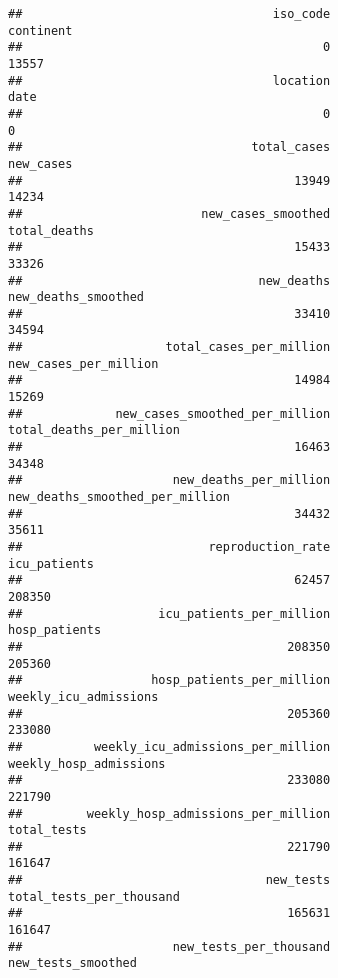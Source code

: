 \documentclass[
]{article}
\begin{document}
\begin{verbatim}
##                                   iso_code                                  continent 
##                                          0                                      13557 
##                                   location                                       date 
##                                          0                                          0 
##                                total_cases                                  new_cases 
##                                      13949                                      14234 
##                         new_cases_smoothed                               total_deaths 
##                                      15433                                      33326 
##                                 new_deaths                        new_deaths_smoothed 
##                                      33410                                      34594 
##                    total_cases_per_million                      new_cases_per_million 
##                                      14984                                      15269 
##             new_cases_smoothed_per_million                   total_deaths_per_million 
##                                      16463                                      34348 
##                     new_deaths_per_million            new_deaths_smoothed_per_million 
##                                      34432                                      35611 
##                          reproduction_rate                               icu_patients 
##                                      62457                                     208350 
##                   icu_patients_per_million                              hosp_patients 
##                                     208350                                     205360 
##                  hosp_patients_per_million                      weekly_icu_admissions 
##                                     205360                                     233080 
##          weekly_icu_admissions_per_million                     weekly_hosp_admissions 
##                                     233080                                     221790 
##         weekly_hosp_admissions_per_million                                total_tests 
##                                     221790                                     161647 
##                                  new_tests                   total_tests_per_thousand 
##                                     165631                                     161647 
##                     new_tests_per_thousand                         new_tests_smoothed 

\end{verbatim}
\end{document}
